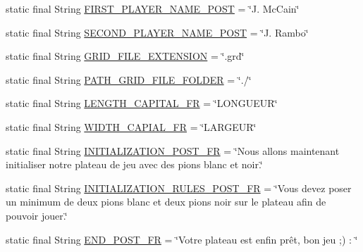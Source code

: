 \begin{DoxyCompactItemize}
\item 
static final String \hyperlink{interfacecom_1_1publisher_1_1utils_1_1PostsPublisher_ad8c17352ce0468f59dc8c606326b22f6}{F\-I\-R\-S\-T\-\_\-\-P\-L\-A\-Y\-E\-R\-\_\-\-N\-A\-M\-E\-\_\-\-P\-O\-S\-T} = \char`\"{}J. Mc\-Cain\char`\"{}
\item 
static final String \hyperlink{interfacecom_1_1publisher_1_1utils_1_1PostsPublisher_abc76d68d032fc3a1224d27e24dcb902c}{S\-E\-C\-O\-N\-D\-\_\-\-P\-L\-A\-Y\-E\-R\-\_\-\-N\-A\-M\-E\-\_\-\-P\-O\-S\-T} = \char`\"{}J. Rambo\char`\"{}
\item 
static final String \hyperlink{interfacecom_1_1publisher_1_1utils_1_1PostsPublisher_a107081df721e9d113677a033f9a8973f}{G\-R\-I\-D\-\_\-\-F\-I\-L\-E\-\_\-\-E\-X\-T\-E\-N\-S\-I\-O\-N} = \char`\"{}.grd\char`\"{}
\item 
static final String \hyperlink{interfacecom_1_1publisher_1_1utils_1_1PostsPublisher_a22251ae0d1faab17907daa8d346ddb21}{P\-A\-T\-H\-\_\-\-G\-R\-I\-D\-\_\-\-F\-I\-L\-E\-\_\-\-F\-O\-L\-D\-E\-R} = \char`\"{}./\char`\"{}
\item 
static final String \hyperlink{interfacecom_1_1publisher_1_1utils_1_1PostsPublisher_a35181a7f4544547873071e5908cb9ea3}{L\-E\-N\-G\-T\-H\-\_\-\-C\-A\-P\-I\-T\-A\-L\-\_\-\-F\-R} = \char`\"{}L\-O\-N\-G\-U\-E\-U\-R\char`\"{}
\item 
static final String \hyperlink{interfacecom_1_1publisher_1_1utils_1_1PostsPublisher_afffd7227ff17b003ba7a78e43fee9a3c}{W\-I\-D\-T\-H\-\_\-\-C\-A\-P\-I\-A\-L\-\_\-\-F\-R} = \char`\"{}L\-A\-R\-G\-E\-U\-R\char`\"{}
\item 
static final String \hyperlink{interfacecom_1_1publisher_1_1utils_1_1PostsPublisher_a6ee7f46f5a4b136c2f6947439a999555}{I\-N\-I\-T\-I\-A\-L\-I\-Z\-A\-T\-I\-O\-N\-\_\-\-P\-O\-S\-T\-\_\-\-F\-R} = \char`\"{}Nous allons maintenant initialiser notre plateau de jeu avec des pions blanc et noir.\char`\"{}
\item 
static final String \hyperlink{interfacecom_1_1publisher_1_1utils_1_1PostsPublisher_a3752365d52e5597a899eca33556b7e8d}{I\-N\-I\-T\-I\-A\-L\-I\-Z\-A\-T\-I\-O\-N\-\_\-\-R\-U\-L\-E\-S\-\_\-\-P\-O\-S\-T\-\_\-\-F\-R} = \char`\"{}Vous devez poser un minimum de deux pions blanc et deux pions noir sur le plateau afin de pouvoir jouer.\char`\"{}
\item 
static final String \hyperlink{interfacecom_1_1publisher_1_1utils_1_1PostsPublisher_a86d6de5d7aa158041f7f40e688bf7d16}{E\-N\-D\-\_\-\-P\-O\-S\-T\-\_\-\-F\-R} = \char`\"{}Votre plateau est enfin prêt, bon jeu ;) \-: \char`\"{}

\end{DoxyCompactItemize}
